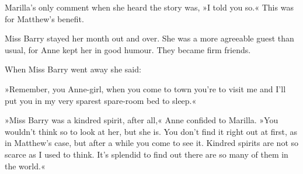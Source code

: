 Marilla's only comment when she heard the story was, »I told you so.« This was for Matthew's benefit.

Miss Barry stayed her month out and over. She was a more agreeable guest than usual, for Anne kept her in good humour. They became firm friends.

When Miss Barry went away she said:

»Remember, you Anne-girl, when you come to town you're to visit me and I'll put you in my very sparest spare-room bed to sleep.«

»Miss Barry was a kindred spirit, after all,« Anne confided to Marilla. »You wouldn't think so to look at her, but she is. You don't find it right out at first, as in Matthew's case, but after a while you come to see it. Kindred spirits are not so scarce as I used to think. It's splendid to find out there are so many of them in the world.«